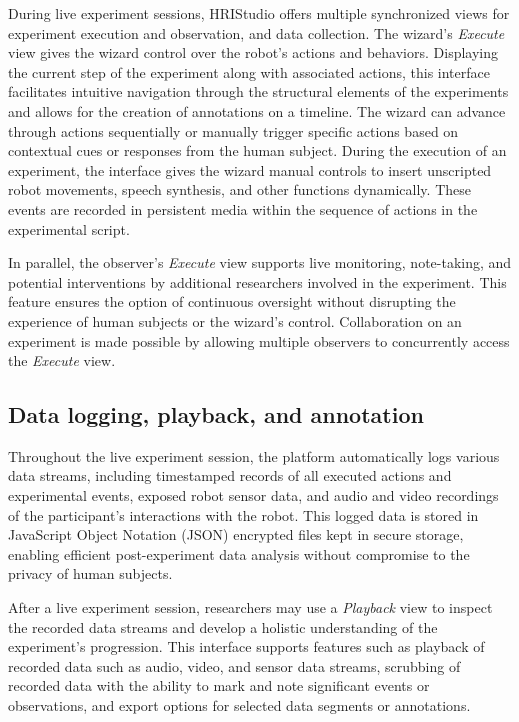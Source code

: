 \documentclass[letterpaper, 10 pt, conference]{ieeeconf}
\begin{document}
During live experiment sessions, HRIStudio offers multiple synchronized views for experiment execution and observation, and data collection. The wizard's \emph{Execute} view gives the wizard control over the robot's actions and behaviors. Displaying the current step of the experiment along with associated actions, this interface facilitates intuitive navigation through the structural elements of the experiments and allows for the creation of annotations on a timeline. The wizard can advance through actions sequentially or manually trigger specific actions based on contextual cues or responses from the human subject. During the execution of an experiment, the interface gives the wizard manual controls to insert unscripted robot movements, speech synthesis, and other functions dynamically. These events are recorded in persistent media within the sequence of actions in the experimental script.

In parallel, the observer's \emph{Execute} view supports live monitoring, note-taking, and potential interventions by additional researchers involved in the experiment. This feature ensures the option of continuous oversight without disrupting the experience of human subjects or the wizard's control. Collaboration on an experiment is made possible by allowing multiple observers to concurrently access the \emph{Execute} view.

\subsection{Data logging, playback, and annotation}

Throughout the live experiment session, the platform automatically logs various data streams, including timestamped records of all executed actions and experimental events, exposed robot sensor data, and audio and video recordings of the participant's interactions with the robot. This logged data is stored in JavaScript Object Notation (JSON)  encrypted files kept in secure storage, enabling efficient post-experiment data analysis without compromise to the privacy of human subjects.

After a live experiment session, researchers may use a \emph{Playback} view to inspect the recorded data streams and develop a holistic understanding of the experiment's progression. This interface supports features such as playback of recorded data such as audio, video, and sensor data streams, scrubbing of recorded data with the ability to mark and note significant events or observations, and export options for selected data segments or annotations.
\end{document}
